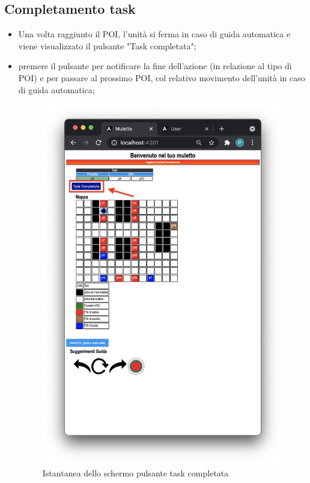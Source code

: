 \subsection{Completamento task}
\begin{itemize}
    \item Una volta raggiunto il POI, l'unità si ferma in caso di guida automatica e viene visualizzato il pulsante "Task completata";
    \item premere il pulsante per notificare la fine dell'azione (in relazione al tipo di POI) e per passare al prossimo POI, col relativo movimento dell'unità in caso di guida automatica;
    \begin{figure}[H]
        \centering
        	\includegraphics[scale=0.45]{res/images/forklift_taskcompletata.png}
        	\caption{Istantanea dello schermo pulsante task completata}

\end{figure}
\end{itemize}
